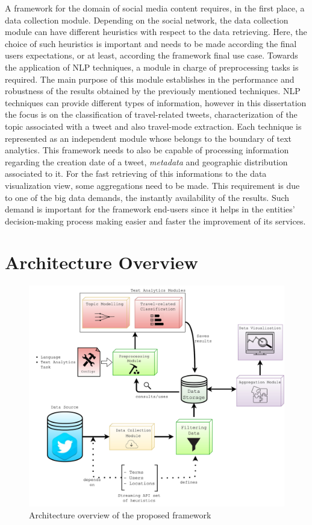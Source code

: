 A framework for the domain of social media content requires, in the first place, a data collection module. Depending on the social network, the data collection module can have different heuristics with respect to the data retrieving. Here, the choice of such heuristics is important and needs to be made according the final users expectations, or at least, according the framework final use case. Towards the application of NLP techniques, a module in charge of preprocessing tasks is required. The main purpose of this module establishes in the performance and robustness of the results obtained by the previously mentioned techniques. NLP techniques can provide different types of information, however in this dissertation the focus is on the classification of travel-related tweets, characterization of the topic associated with a tweet and also travel-mode extraction. Each technique is represented as an independent module whose belongs to the boundary of text analytics. This framework needs to also be capable of processing information regarding the creation date of a tweet, \textit{metadata} and geographic distribution associated to it. For the fast retrieving of this informations to the data visualization view, some aggregations need to be made. This requirement is due to one of the big data demands, the instantly availability of the results. Such demand is important for the framework end-users since it helps in the entities' decision-making process making easier and faster the improvement of its services.

\section{Architecture Overview}\label{sec:architecture}



\begin{figure}[htbp]
	\centering
	\includegraphics[width=\textwidth]{figures/architecture.pdf}
	\caption[Framework Architecture Overview]{Architecture overview of the proposed framework}
	\label{fig:architecture}
\end{figure}

